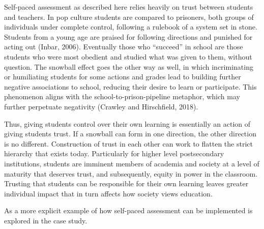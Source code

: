 Self-paced assessment as described here relies heavily on trust between students and teachers. In pop culture students are compared to prisoners, both groups of individuals under complete control, following a rulebook of a system set in stone. Students from a young age are praised for following directions and punished for acting out (Inbar, 2006). Eventually those who ``succeed'' in school are those students who were most obedient and studied what was given to them, without question. The snowball effect goes the other way as well, in which incriminating or humiliating students for some actions and grades lead to building further negative associations to school, reducing their desire to learn or participate. This phenomenon aligns with the school-to-prison-pipeline metaphor, which may further perpetuate negativity (Crawley and Hirschfield, 2018).

Thus, giving students control over their own learning is essentially an action of giving students trust. If a snowball can form in one direction, the other direction is no different. Construction of trust in each other can work to flatten the strict hierarchy that exists today. Particularly for higher level postsecondary institutions, students are imminent members of academia and society at a level of maturity that deserves trust, and subsequently, equity in power in the classroom. Trusting that students can be responsible for their own learning leaves greater individual impact that in turn affects how society views education.

As a more explicit example of how self-paced assessment can be implemented is explored in the case study.
